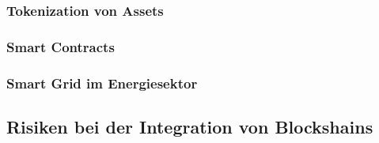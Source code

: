 \subsubsection{Tokenization von Assets}

\subsubsection{Smart Contracts}
\cite[p.~14]{pirafelnerblockchaintechnologie}

\subsubsection{Smart Grid im Energiesektor}
\cite[p.~72]{fill2020blockchain}


\subsection{Risiken bei der Integration von Blockshains}
\cite[p.~17]{pirafelnerblockchaintechnologie}